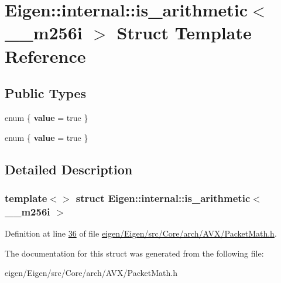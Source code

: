 \hypertarget{struct_eigen_1_1internal_1_1is__arithmetic_3_01____m256i_01_4}{}\section{Eigen\+:\+:internal\+:\+:is\+\_\+arithmetic$<$ \+\_\+\+\_\+m256i $>$ Struct Template Reference}
\label{struct_eigen_1_1internal_1_1is__arithmetic_3_01____m256i_01_4}
\subsection*{Public Types}
\begin{DoxyCompactItemize}
\item 
\mbox{\label{struct_eigen_1_1internal_1_1is__arithmetic_3_01____m256i_01_4_a5f1edf29ceef14f55b6c05353c466f70}} 
enum \{ {\bfseries value} = true
 \}
\item 
\mbox{\label{struct_eigen_1_1internal_1_1is__arithmetic_3_01____m256i_01_4_a3a672606569308abb811599f96f53ddd}} 
enum \{ {\bfseries value} = true
 \}
\end{DoxyCompactItemize}


\subsection{Detailed Description}
\subsubsection*{template$<$$>$\newline
struct Eigen\+::internal\+::is\+\_\+arithmetic$<$ \+\_\+\+\_\+m256i $>$}



Definition at line \hyperlink{eigen_2_eigen_2src_2_core_2arch_2_a_v_x_2_packet_math_8h_source_l00036}{36} of file \hyperlink{eigen_2_eigen_2src_2_core_2arch_2_a_v_x_2_packet_math_8h_source}{eigen/\+Eigen/src/\+Core/arch/\+A\+V\+X/\+Packet\+Math.\+h}.



The documentation for this struct was generated from the following file\+:\begin{DoxyCompactItemize}
\item 
eigen/\+Eigen/src/\+Core/arch/\+A\+V\+X/\+Packet\+Math.\+h\end{DoxyCompactItemize}
